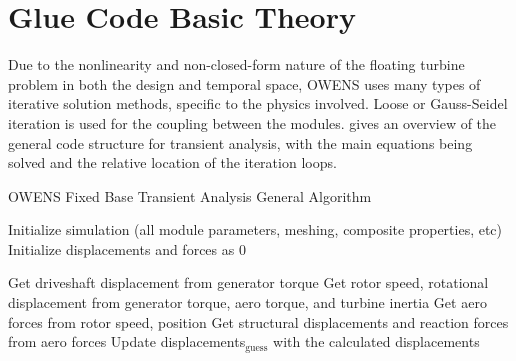 \documentclass[11pt]{article}
\begin{document}

\vspace{12pt}



\section{Glue Code Basic Theory}

Due to the nonlinearity and non-closed-form nature of the floating turbine problem in both the design and temporal space, OWENS uses many types of iterative solution methods, specific to the physics involved.  Loose or Gauss-Seidel iteration is used for the coupling between the modules.   gives an overview of the general code structure for transient analysis, with the main equations being solved and the relative location of the iteration loops.

\begin{algorithm}
\caption{OWENS Fixed Base Transient Analysis General Algorithm}
\begin{spacing}{1.18}
\begin{algorithmic}[1]
\State Initialize simulation (all module parameters, meshing, composite properties, etc)
\State Initialize displacements and forces as 0


		\State Get driveshaft displacement from generator torque
		\State Get rotor speed, rotational displacement from generator torque, aero torque, and turbine inertia
		\State Get aero forces from rotor speed, position
		\State Get structural displacements and reaction forces from aero forces
		\State Update displacements$_\text{guess}$ with the calculated displacements
	\EndWhile
\EndFor

\end{algorithmic}
\end{spacing}
\label{alg:Transient}
\end{algorithm}
\end{document}
